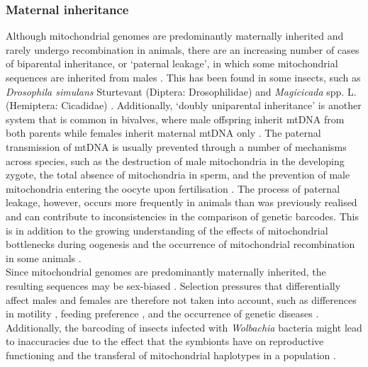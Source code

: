 \subsubsection{Maternal inheritance}
Although mitochondrial genomes are predominantly maternally inherited and rarely undergo recombination in animals, there are an increasing number of cases of biparental inheritance, or `paternal leakage', in which some mitochondrial sequences are inherited from males \citep{Gyllensten1991, Zouros1992, Skibinski1994, Hoarau2002, Kvist2003, Barr2005, Xiong2013, Ladoukakis2017}. This has been found in some insects, such as \textit{Drosophila simulans} Sturtevant (Diptera: Drosophilidae) \citep{Wolff2013} and \textit{Magicicada} spp. L. (Hemiptera: Cicadidae) \citep{Fontaine2007}. Additionally, `doubly uniparental inheritance' is another system that is common in bivalves, where male offspring inherit mtDNA from both parents while females inherit maternal mtDNA only \citep{Zouros1994}. The paternal transmission of mtDNA is usually prevented through a number of mechanisms across species, such as the destruction of male mitochondria in the developing zygote, the total absence of mitochondria in sperm, and the prevention of male mitochondria entering the oocyte upon fertilisation \citep{Rokas2003}. The process of paternal leakage, however, occurs more frequently in animals than was previously realised and can contribute to inconsistencies in the comparison of genetic barcodes. This is in addition to the growing understanding of the effects of mitochondrial bottlenecks during oogenesis \citep{Jenuth1996, Stewart2008} and the occurrence of mitochondrial recombination in some animals \citep{Piganeau2004, Rubinoff2006a}. \\
Since mitochondrial genomes are predominantly maternally inherited, the resulting sequences may be sex-biased \citep{Rubinoff2006a, Frezal2008, Innocenti2011}. Selection pressures that differentially affect males and females are therefore not taken into account, such as differences in motility \citep{Rubinoff2004}, feeding preference \citep{Hulcr2007}, and the occurrence of genetic diseases \citep{Frank1996, Camus2012}. Additionally, the barcoding of insects infected with \textit{Wolbachia} bacteria might lead to inaccuracies due to the effect that the symbionts have on reproductive functioning and the transferal of mitochondrial haplotypes in a population \citep{Gerth2011}. 

